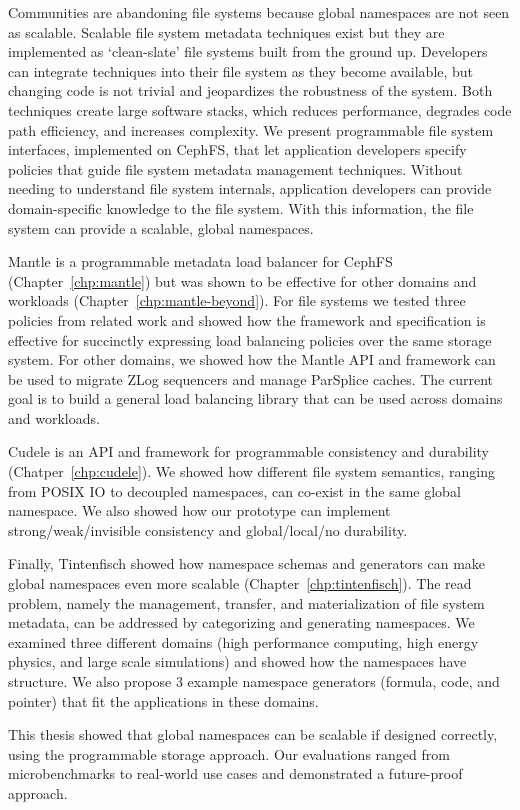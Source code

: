 Communities are abandoning file systems because global namespaces are not seen
as scalable.  Scalable file system metadata techniques exist but they are
implemented as `clean-slate' file systems built from the ground up. Developers
can integrate techniques into their file system as they become available, but
changing code is not trivial and jeopardizes the robustness of the system. Both
techniques create large software stacks, which reduces performance, degrades
code path efficiency, and increases complexity. We present programmable file
system interfaces, implemented on CephFS, that let application developers
specify policies that guide file system metadata management techniques. Without
needing to understand file system internals, application developers can provide
domain-specific knowledge to the file system. With this information, the file
system can provide a scalable, global namespaces.

Mantle is a programmable metadata load balancer for CephFS
(Chapter~\ref{chp:mantle}) but was shown to be effective for other domains and
workloads (Chapter~\ref{chp:mantle-beyond}). For file systems we tested three
policies from related work and showed how the framework and specification is
effective for succinctly expressing load balancing policies over the same
storage system. For other domains, we showed how the Mantle API and framework
can be used to migrate ZLog sequencers and manage ParSplice caches. The current
goal is to build a general load balancing library that can be used across
domains and workloads.

Cudele is an API and framework for programmable consistency and durability
(Chatper~\ref{chp:cudele}). We showed how different file system semantics,
ranging from POSIX IO to decoupled namespaces, can co-exist in the same global
namespace. We also showed how our prototype can implement strong/weak/invisible
consistency and global/local/no durability.

Finally, Tintenfisch showed how namespace schemas and generators can make global
namespaces even more scalable (Chapter~\ref{chp:tintenfisch}). The read
problem, namely the management, transfer, and materialization of file system
metadata, can be addressed by categorizing and generating namespaces. We
examined three different domains (high performance computing, high energy
physics, and large scale simulations) and showed how the namespaces have
structure. We also propose 3 example namespace generators (formula, code, and
pointer) that fit the applications in these domains.

This thesis showed that global namespaces can be scalable if designed correctly,
using the programmable storage approach. Our evaluations ranged from
microbenchmarks to real-world use cases and demonstrated a future-proof
approach.
